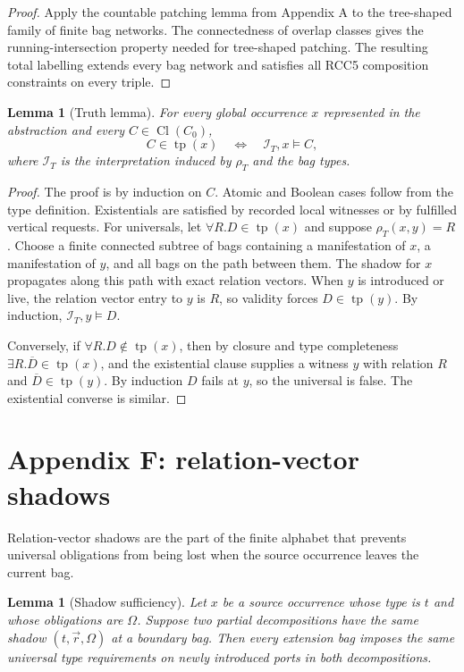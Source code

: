 \documentclass[11pt]{article}
\newtheorem{lemma}[theorem]{Lemma}
\newcommand{\Cl}{\operatorname{Cl}}
\newcommand{\tp}{\operatorname{tp}}
\newcommand{\calI}{\mathcal I}
\begin{document}
\begin{proof}
Apply the countable patching lemma from Appendix A to the tree-shaped family of finite bag networks.  The connectedness of overlap classes gives the running-intersection property needed for tree-shaped patching.  The resulting total labelling extends every bag network and satisfies all RCC5 composition constraints on every triple.
\end{proof}

\begin{lemma}[Truth lemma]
For every global occurrence $x$ represented in the abstraction and every $C\in\Cl(C_0)$,
\[
C\in\tp(x)\quad\Longleftrightarrow\quad \calI_T,x\models C,
\]
where $\calI_T$ is the interpretation induced by $\rho_T$ and the bag types.
\end{lemma}

\begin{proof}
The proof is by induction on $C$.  Atomic and Boolean cases follow from the type definition.  Existentials are satisfied by recorded local witnesses or by fulfilled vertical requests.  For universals, let $\forall R.D\in\tp(x)$ and suppose $\rho_T(x,y)=R$.  Choose a finite connected subtree of bags containing a manifestation of $x$, a manifestation of $y$, and all bags on the path between them.  The shadow for $x$ propagates along this path with exact relation vectors.  When $y$ is introduced or live, the relation vector entry to $y$ is $R$, so validity forces $D\in\tp(y)$.  By induction, $\calI_T,y\models D$.

Conversely, if $\forall R.D\notin\tp(x)$, then by closure and type completeness $\exists R.\overline D\in\tp(x)$, and the existential clause supplies a witness $y$ with relation $R$ and $\overline D\in\tp(y)$.  By induction $D$ fails at $y$, so the universal is false.  The existential converse is similar.
\end{proof}

\section{Appendix F: relation-vector shadows}

Relation-vector shadows are the part of the finite alphabet that prevents universal obligations from being lost when the source occurrence leaves the current bag.

\begin{lemma}[Shadow sufficiency]
Let $x$ be a source occurrence whose type is $t$ and whose obligations are $\Omega$.  Suppose two partial decompositions have the same shadow $(t,\vec r,\Omega)$ at a boundary bag.  Then every extension bag imposes the same universal type requirements on newly introduced ports in both decompositions.
\end{lemma}
\end{document}
